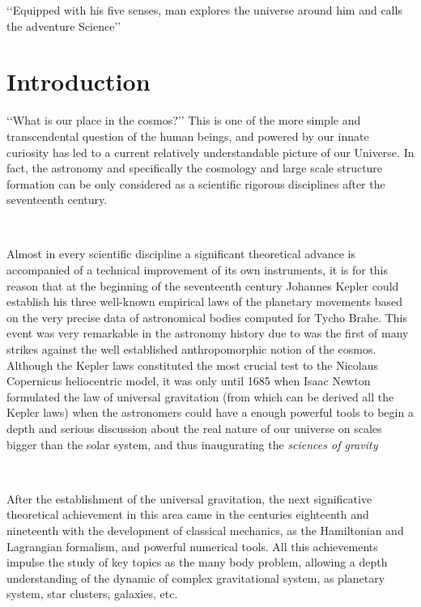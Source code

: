 

\begin{savequote}[50mm]
‘‘Equipped with his five senses, man explores the universe around him and 
calls the adventure Science’’
\end{savequote}


\chapter{Introduction}
\label{cha:Introduction}

 

‘‘What is our place in the cosmos?’’ This is one of the more simple and 
trans\-cendental question of the human beings, and powered by our innate 
curiosity has led to a current relatively understandable picture of our 
Universe. In fact, the astronomy and specifically the cosmology and large
scale structure formation can be only considered as a scientific rigorous
disciplines after the seventeenth century.

\

Almost in every scientific discipline a significant theoretical advance is 
accompanied of a technical improvement of its own instruments, it is for this 
reason that at the beginning of the seventeenth century Johannes Kepler could
establish his three well-known empirical laws of the planetary movements 
based on the very precise data of astronomical bodies computed for Tycho Brahe. 
This event was very remarkable in the astronomy history due to was the first
of many strikes against the well established anthropomorphic notion of the 
cosmos. Although the Kepler laws constituted the most crucial test to the Nicolaus 
Copernicus heliocentric model, it was only until 1685 when Isaac Newton 
formulated the law of universal gravitation (from which can be derived all 
the Kepler laws) when the astronomers could have a enough powerful tools to
begin a depth and serious discussion about the real nature of our universe on 
scales bigger than the solar system, and thus inaugurating the \textit{sciences 
of gravity} \cite{longair2008}

\

After the establishment of the universal gravitation, the next significative 
theo\-retical achievement in this area came in the centuries eighteenth and 
nineteenth with the development of classical mechanics, as the Hamiltonian 
and Lagrangian formalism, and powerful numerical tools. All this achievements 
impulse the study of key topics as the many body problem, allowing a depth 
understanding of the dynamic of complex gravitational system, as planetary
system, star clusters, galaxies, etc. 

